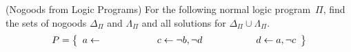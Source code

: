 \begin{Uebung}{(Nogoods from Logic Programs)}
For the following normal logic program~$\Pi$,
find the sets of nogoods $\Delta_\Pi$ and $\Lambda_\Pi$
and all solutions for $\Delta_\Pi\cup\Lambda_\Pi$.
\[
\Pi =
\left\{
\begin{array}{r@{}c@{}l@{\hspace{20mm}}r@{}c@{}l@{\hspace{19.7mm}}r@{}c@{}l}
a & {} \leftarrow {} & &
c & {} \leftarrow {} & \naf b, \naf d &
d & {} \leftarrow {} & a, \naf c
\end{array}
\right\}
\]
\end{Uebung}

